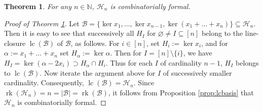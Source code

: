 \documentclass[10pt,a4paper]{amsart}
\newtheorem{theorem}{Theorem}
\newcommand\BBN{{\mathbb N}}
\newcommand\CB{{\mathscr B}}
\newcommand\CH{{\mathscr H}}
\newcommand\lc{{\operatorname{lc}}}
\newcommand\rk{\operatorname{rk}}
\begin{document}
\begin{theorem}
	\label{thm:HAformal}
		For any $n \in \BBN$,  $\CH_n$ is combinatorially formal.
\end{theorem}

\begin{proof}[{Proof of Theorem \ref{thm:HAformal}}]
Let $\CB = \{\ker x_1, \ldots, \ker x_{n-1}, \ker(x_1 + \ldots + x_n)\} \subseteq \CH_n$.
Then it is easy to see that successively all $H_I$ for $\varnothing \ne I \subseteq [n]$ belong to the line-closure $\lc(\CB)$ of $\CB$, as follows. 
For $i \in [n]$, set $H_i := \ker x_i$, and 
for $\alpha := x_1 + \ldots + x_n$ set $H_\alpha := \ker \alpha$. 
Then for $I = [n]\setminus \{i\}$, we have
$H_I = \ker \left(\alpha -2 x_i\right) \supset H_\alpha \cap H_i$. Thus for each $I$ of cardinality $n-1$, $H_I$ belongs to $\lc(\CB)$. Now iterate the argument above for $I$ of successively smaller cardinality.
Consequently, $\lc(\CB) =  \CH_n$. Since
	$\rk(\CH_n) = n = |\CB| = \rk(\CB)$, it follows from Proposition \ref{prop:lcbasis}	that $\CH_n$ is combinatorially formal.
\end{proof}
\end{document}
